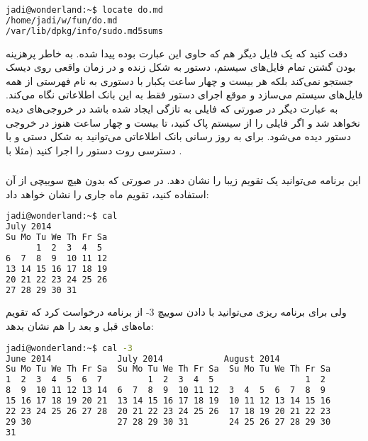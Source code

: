 \begin{latin}
\begin{lstlisting}[language=bash,basicstyle=\ttfamily,linewidth=12cm]
jadi@wonderland:~$ locate do.md
/home/jadi/w/fun/do.md
/var/lib/dpkg/info/sudo.md5sums
\end{lstlisting}
\end{latin}

دقت کنید که یک فایل دیگر هم که حاوی این عبارت بوده پیدا شده.
به خاطر پرهزینه بودن گشتن تمام فایل‌های سیستم، دستور 
 به شکل زنده و در زمان واقعی روی دیسک جستجو نمی‌کند بلکه هر بیست و چهار ساعت یکبار با دستوری به نام 
 فهرستی از همه فایل‌های سیستم می‌سازد و موقع اجرای دستور 
 فقط به این بانک اطلاعاتی نگاه می‌کند. به عبارت دیگر در صورتی که فایلی به تازگی ایجاد شده باشد در خروجی‌های 
 دیده نخواهد شد و اگر فایلی را از سیستم پاک کنید، تا بیست و چهار ساعت هنوز در خروجی دستور 
 دیده می‌شود. برای به روز رسانی بانک اطلاعاتی می‌توانید به شکل دستی و با دسترسی روت دستور 
 را اجرا کنید (مثلا با
.
\subsubsection*{}
این برنامه می‌توانید یک تقویم زیبا را نشان دهد. در صورتی که بدون هیچ سوییچی از آن استفاده کنید، تقویم ماه جاری را نشان خواهد داد:

\begin{latin}

\begin{lstlisting}[language=bash,basicstyle=\ttfamily,linewidth=12cm]
jadi@wonderland:~$ cal
July 2014        
Su Mo Tu We Th Fr Sa  
      1  2  3  4  5  
6  7  8  9  10 11 12  
13 14 15 16 17 18 19  
20 21 22 23 24 25 26  
27 28 29 30 31    
\end{lstlisting}

\end{latin}

ولی برای برنامه ریزی می‌توانید با دادن سوییچ 3- از برنامه درخواست کرد که تقویم ماه‌های قبل و بعد را هم نشان بدهد:

\begin{latin}
\begin{footnotesize}
\begin{lstlisting}[language=bash,basicstyle=\ttfamily,linewidth=14cm]
jadi@wonderland:~$ cal -3
June 2014             July 2014            August 2014       
Su Mo Tu We Th Fr Sa  Su Mo Tu We Th Fr Sa  Su Mo Tu We Th Fr Sa  
1  2  3  4  5  6  7         1  2  3  4  5                  1  2  
8  9  10 11 12 13 14  6  7  8  9  10 11 12  3  4  5  6  7  8  9
15 16 17 18 19 20 21  13 14 15 16 17 18 19  10 11 12 13 14 15 16  
22 23 24 25 26 27 28  20 21 22 23 24 25 26  17 18 19 20 21 22 23  
29 30                 27 28 29 30 31        24 25 26 27 28 29 30  
31     
\end{lstlisting}
\end{footnotesize}
\end{latin}

